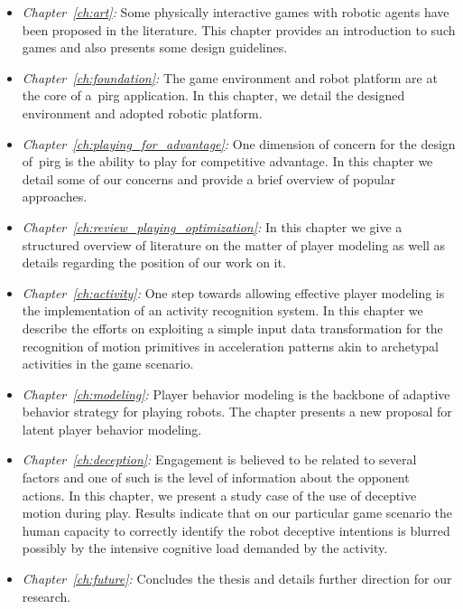 \begin{itemize}
\item\emph{Chapter~\ref{ch:art}:} Some physically interactive games with robotic agents have been proposed in the literature. This chapter provides an introduction to such games and also presents some design guidelines. %
\item\emph{Chapter~\ref{ch:foundation}:} The game environment and robot platform are at the core of a~\gls{pirg} application. In this chapter, we detail the designed environment and adopted robotic platform.
\item\emph{Chapter~\ref{ch:playing_for_advantage}:} One dimension of concern for the design of~\gls{pirg} is the ability to play for competitive advantage. In this chapter we detail some of our concerns and provide a brief overview of popular approaches.
\item\emph{Chapter~\ref{ch:review_playing_optimization}:} In this chapter we give a structured overview of literature on the matter of player modeling as well as details regarding the position of our work on it.
\item\emph{Chapter~\ref{ch:activity}:} One step towards allowing effective player modeling is the implementation of an activity recognition system. In this chapter we describe the efforts on exploiting a simple input data transformation for the recognition of motion primitives in acceleration patterns akin to archetypal activities in the game scenario.
\item\emph{Chapter~\ref{ch:modeling}:} Player behavior modeling is the backbone of adaptive behavior strategy for playing robots. The chapter presents a new proposal for latent player behavior modeling.
\item\emph{Chapter~\ref{ch:deception}:} Engagement is believed to be related to several factors and one of such is the level of information about the opponent actions. In this chapter, we present a study case of the use of deceptive motion during play. Results indicate that on our particular game scenario the human capacity to correctly identify the robot deceptive intentions is blurred possibly by the intensive cognitive load demanded by the activity.
\item\emph{Chapter~\ref{ch:future}:} Concludes the thesis and details further direction for our research.
\end{itemize}

